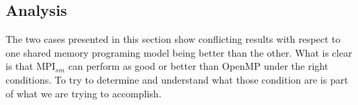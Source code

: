 \begin{comment}
\medskip

Notice that the ratio of time taken by MPI$_{sm}$ to OpenMP, shown in Figure \ref{fig:RatioDunkelCFD_Pin} is close to 1 indicating a similar performance between the MPI$_{sm}$ and the OpenMP versions of the program.
...







\end{comment} 


\subsection*{Analysis}
The two cases presented in this section show conflicting results with respect to one shared memory programing model being better than the other. What is clear is that MPI$_{sm}$ can perform as good or better than OpenMP under the right conditions. To try to determine and understand what those condition are is part of what we are trying to accomplish.


